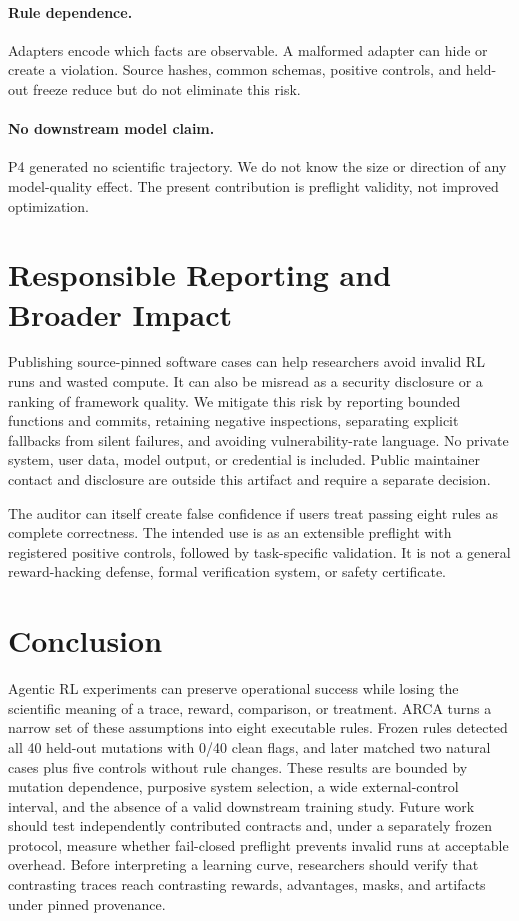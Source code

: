 \documentclass[10pt]{article}
\newcommand{\arca}{\textsc{ARCA}}
\begin{document}
\paragraph{Rule dependence.}
Adapters encode which facts are observable.  A malformed adapter can hide or
create a violation.  Source hashes, common schemas, positive controls, and
held-out freeze reduce but do not eliminate this risk.

\paragraph{No downstream model claim.}
P4 generated no scientific trajectory.  We do not know the size or direction
of any model-quality effect.  The present contribution is preflight validity,
not improved optimization.

\section{Responsible Reporting and Broader Impact}

Publishing source-pinned software cases can help researchers avoid invalid RL
runs and wasted compute.  It can also be misread as a security disclosure or a
ranking of framework quality.  We mitigate this risk by reporting bounded
functions and commits, retaining negative inspections, separating explicit
fallbacks from silent failures, and avoiding vulnerability-rate language.
No private system, user data, model output, or credential is included.  Public
maintainer contact and disclosure are outside this artifact and require a
separate decision.

The auditor can itself create false confidence if users treat passing eight
rules as complete correctness.  The intended use is as an extensible preflight
with registered positive controls, followed by task-specific validation.  It
is not a general reward-hacking defense, formal verification system, or safety
certificate.

\section{Conclusion}

Agentic RL experiments can preserve operational success while losing the
scientific meaning of a trace, reward, comparison, or treatment.  \arca{}
turns a narrow set of these assumptions into eight executable rules.  Frozen
rules detected all 40 held-out mutations with 0/40 clean flags, and later
matched two natural cases plus five controls without rule changes.  These
results are bounded by mutation dependence, purposive system selection, a
wide external-control interval, and the absence of a valid downstream training
study.  Future work should test independently contributed contracts and, under
a separately frozen protocol, measure whether fail-closed preflight prevents
invalid runs at acceptable overhead.  Before interpreting a learning curve,
researchers should verify that contrasting traces reach contrasting rewards,
advantages, masks, and artifacts under pinned provenance.
\end{document}
